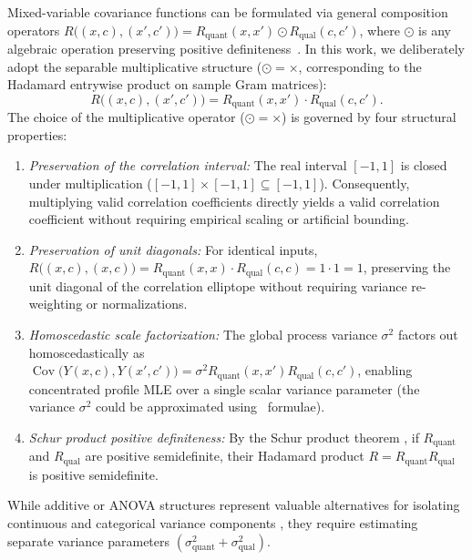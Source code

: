 \documentclass[default,sn-mathphys,Numbered]{sn-jnl}
\theoremstyle{thmstyleone}
\theoremstyle{thmstylethree}
\theoremstyle{thmstyletwo}
\begin{document}
Mixed-variable covariance functions can be formulated via general composition operators $R\bigl((x, c), (x', c')\bigr) = R_{\mathrm{quant}}(x, x') \odot R_{\mathrm{qual}}(c, c')$, where $\odot$ is any algebraic operation preserving positive definiteness~\citep{Roustant}. In this work, we deliberately adopt the separable multiplicative structure ($\odot = \times$, corresponding to the Hadamard entrywise product on sample Gram matrices):
\begin{equation}
\label{eq:separable_kernel}
R\bigl((x, c), (x', c')\bigr) = R_{\mathrm{quant}}(x, x') \cdot R_{\mathrm{qual}}(c, c').
\end{equation}
The choice of the multiplicative operator ($\odot = \times$) is governed by four structural properties:
\begin{enumerate}
    \item[(i)] \textit{Preservation of the correlation interval:} The real interval $[-1, 1]$ is closed under multiplication ($[-1, 1] \times [-1, 1] \subseteq [-1, 1]$). Consequently, multiplying valid correlation coefficients directly yields a valid correlation coefficient without requiring empirical scaling or artificial bounding.
    \item[(ii)] \textit{Preservation of unit diagonals:} For identical inputs, $R\bigl((x, c), (x, c)\bigr) = R_{\mathrm{quant}}(x, x) \cdot R_{\mathrm{qual}}(c, c) = 1 \cdot 1 = 1$, preserving the unit diagonal of the correlation elliptope without requiring variance re-weighting or normalizations.
    \item[(iii)] \textit{Homoscedastic scale factorization:} The global process variance $\sigma^2$ factors out homoscedastically as $\operatorname{Cov}\bigl(Y(x, c), Y(x', c')\bigr) = \sigma^2 R_{\mathrm{quant}}(x, x') R_{\mathrm{qual}}(c, c')$, enabling concentrated profile MLE over a single scalar variance parameter (the variance $\sigma^2$ could be approximated using~\citet{Jones98} formulae).
    \item[(iv)] \textit{Schur product positive definiteness:} By the Schur product theorem \citep[Theorem~7.5.1]{horn2012matrix}, if $R_{\mathrm{quant}}$ and $R_{\mathrm{qual}}$ are positive semidefinite, their Hadamard product $R = R_{\mathrm{quant}} R_{\mathrm{qual}}$ is positive semidefinite.
\end{enumerate}
While additive or ANOVA structures represent valuable alternatives for isolating continuous and categorical variance components \citep{Deng,Roustant}, they require estimating separate variance parameters $(\sigma_{\mathrm{quant}}^2 + \sigma_{\mathrm{qual}}^2)$. 
\end{document}
